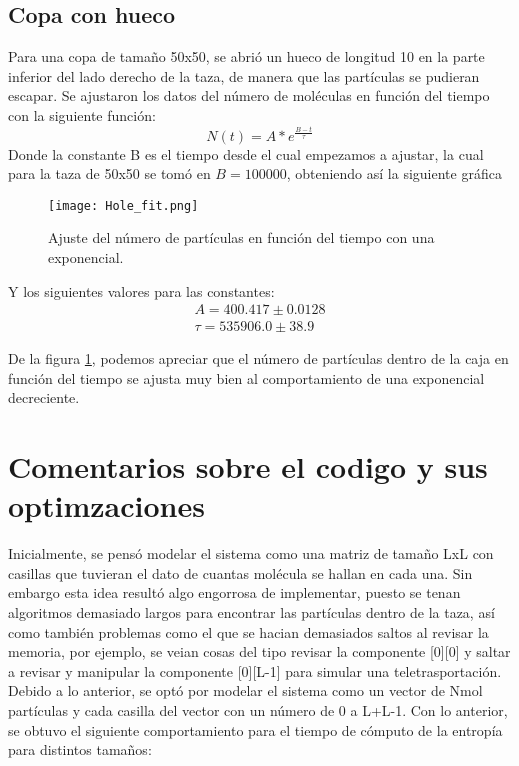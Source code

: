 \documentclass{article}
\begin{document}
\subsection{Copa con hueco}
Para una copa de tamaño 50x50, se abrió un hueco de longitud 10 en la parte inferior del lado derecho de la taza, de manera que las partículas se pudieran escapar. Se ajustaron los datos del número de moléculas en función del tiempo con la siguiente función:
\begin{equation}
    N(t)= A*e^{\frac{B-t}{\tau}}
\end{equation}
Donde la constante B es el tiempo desde el cual empezamos a ajustar, la cual para la taza de 50x50 se tomó en $B=100000$, obteniendo así la siguiente gráfica
\begin{figure}[H]
   \centering
   \texttt{[image: Hole\_fit.png]}
   \caption{Ajuste del número de partículas en función del tiempo con una exponencial.}
   \label{fig:hole}
 \end{figure}
Y los siguientes valores para las constantes:
\begin{align}
    A= 400.417 \pm 0.0128 \\
    \tau = 535906.0 \pm 38.9
\end{align}

De la figura \ref{fig:hole}, podemos apreciar que el número de partículas dentro de la caja en función del tiempo se ajusta muy bien al comportamiento de una exponencial decreciente.


\section{Comentarios sobre el codigo y sus optimzaciones}

Inicialmente, se pensó modelar el sistema como una matriz de tamaño LxL con casillas que tuvieran el dato de cuantas molécula se hallan en cada una. Sin embargo esta idea resultó algo engorrosa de implementar, puesto se tenan algoritmos demasiado largos para encontrar las partículas dentro de la taza, así como también problemas como el que se hacian demasiados saltos al revisar la memoria, por ejemplo, se veian cosas del tipo revisar la componente [0][0] y saltar a revisar y manipular la componente [0][L-1] para simular una teletrasportación. Debido a lo anterior, se optó por modelar el sistema como un vector de Nmol partículas y cada casilla del vector con un número de 0 a L+L-1. Con lo anterior, se obtuvo el siguiente comportamiento para el tiempo de cómputo de la entropía para distintos tamaños:
\end{document}
